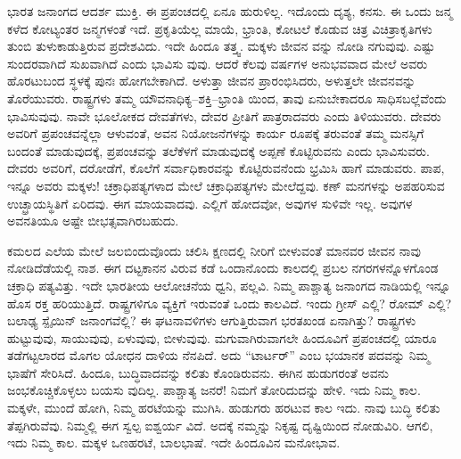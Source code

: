 ಭಾರತ ಜನಾಂಗದ ಆದರ್ಶ ಮುಕ್ತಿ. ಈ ಪ್ರಪಂಚದಲ್ಲಿ ಏನೂ ಹುರುಳಿಲ್ಲ. ಇದೊಂದು ದೃಶ್ಯ, ಕನಸು. ಈ ಒಂದು ಜನ್ಮ ಕಳೆದ ಕೋಟ್ಯಂತರ ಜನ್ಮಗಳಂತೆ ಇದೆ. ಪ್ರಕೃತಿಯೆಲ್ಲ ಮಾಯೆ, ಭ್ರಾಂತಿ, ಕೋಟಲೆ ಕೊಡುವ ಚಿತ್ರ ವಿಚಿತ್ರಾಕೃತಿಗಳು ತುಂಬಿ ತುಳುಕಾಡುತ್ತಿರುವ ಪ್ರದೇಶವಿದು. ಇದೇ ಹಿಂದೂ ತತ್ತ್ವ. ಮಕ್ಕಳು ಜೀವನ ವನ್ನು ನೋಡಿ ನಗುವುವು. ಎಷ್ಟು ಸುಂದರವಾಗಿದೆ ಸುಖವಾಗಿದೆ ಎಂದು ಭಾವಿಸು ವುವು. ಆದರೆ ಕೆಲವು ವರ್ಷಗಳ ಅನುಭವವಾದ ಮೇಲೆ ಅವರು ಹೊರಟುಬಂದ ಸ್ಥಳಕ್ಕೆ ಪುನಃ ಹೋಗಬೇಕಾಗಿದೆ. ಅಳುತ್ತಾ ಜೀವನ ಪ್ರಾರಂಭಿಸಿದರು, ಅಳುತ್ತಲೇ ಜೀವನವನ್ನು ತೊರೆಯುವರು. ರಾಷ್ಟ್ರಗಳು ತಮ್ಮ ಯೌವನಾಧಿಕ್ಯ–ಶಕ್ತಿ–ಭ್ರಾಂತಿ ಯಿಂದ, ತಾವು ಏನುಬೇಕಾದರೂ ಸಾಧಿಸಬಲ್ಲೆವೆಂದು ಭಾವಿಸುವುವು. ನಾವೇ ಭೂಲೋಕದ ದೇವತೆಗಳು, ದೇವರ ಪ್ರೀತಿಗೆ ಪಾತ್ರರಾದವರು ಎಂದು ತಿಳಿಯುವರು. ದೇವರು ಅವರಿಗೆ ಪ್ರಪಂಚವನ್ನೆಲ್ಲಾ ಆಳುವಂತೆ, ಅವನ ನಿಯೋಜನೆಗಳನ್ನು ಕಾರ್ಯ ರೂಪಕ್ಕೆ ತರುವಂತೆ ತಮ್ಮ ಮನಸ್ಸಿಗೆ ಬಂದಂತೆ ಮಾಡುವುದಕ್ಕೆ, ಪ್ರಪಂಚವನ್ನು ತಲೆಕೆಳಗೆ ಮಾಡುವುದಕ್ಕೆ ಅಪ್ಪಣೆ ಕೊಟ್ಟಿರುವನು ಎಂದು ಭಾವಿಸುವರು. ದೇವರು ಅವರಿಗೆ, ದರೋಡೆಗೆ, ಕೊಲೆಗೆ ಸರ್ವಾಧಿಕಾರವನ್ನು ಕೊಟ್ಟಿರುವನೆಂದು ಭ್ರಮಿಸಿ ಹಾಗೆ ಮಾಡುವರು. ಪಾಪ, ಇನ್ನೂ ಅವರು ಮಕ್ಕಳು! ಚಕ್ರಾಧಿಪತ್ಯಗಳಾದ ಮೇಲೆ ಚಕ್ರಾಧಿಪತ್ಯಗಳು ಮೇಲೆದ್ದವು. ಕಣ್​ ಮನಗಳನ್ನು ಅಪಹರಿಸುವ ಉಚ್ಛ್ರಾಯಸ್ಥಿತಿಗೆ ಏರಿದವು. ಈಗ ಮಾಯವಾದವು. ಎಲ್ಲಿಗೆ ಹೋದವೋ, ಅವುಗಳ ಸುಳಿವೇ ಇಲ್ಲ. ಅವುಗಳ ಅವನತಿಯೂ ಅಷ್ಟೇ ಬೀಭತ್ಸವಾಗಿರಬಹುದು.

ಕಮಲದ ಎಲೆಯ ಮೇಲೆ ಜಲಬಿಂದುವೊಂದು ಚಲಿಸಿ ಕ್ಷಣದಲ್ಲಿ ನೀರಿಗೆ ಬೀಳುವಂತೆ ಮಾನವರ ಜೀವನ ನಾವು ನೋಡಿದೆಡೆಯಲ್ಲಿ ನಾಶ. ಈಗ ದಟ್ಟಕಾನನ ವಿರುವ ಕಡೆ ಒಂದಾನೊಂದು ಕಾಲದಲ್ಲಿ ಪ್ರಬಲ ನಗರಗಳನ್ನೊಳಗೊಂಡ ಚಕ್ರಾಧಿ ಪತ್ಯವಿತ್ತು. ಇದೇ ಭಾರತೀಯ ಆಲೋಚನೆಯ ಧ್ವನಿ, ಪಲ್ಲವಿ. ನಿಮ್ಮ ಪಾಶ್ಚಾತ್ಯ ಜನಾಂಗದ ನಾಡಿಯಲ್ಲಿ ಇನ್ನೂ ಹೊಸ ರಕ್ತ ಹರಿಯುತ್ತಿದೆ. ರಾಷ್ಟ್ರಗಳಿಗೂ ವ್ಯಕ್ತಿಗೆ ಇರುವಂತೆ ಒಂದು ಕಾಲವಿದೆ. ಇಂದು ಗ್ರೀಸ್​ ಎಲ್ಲಿ? ರೋಮ್​ ಎಲ್ಲಿ? ಬಲಾಢ್ಯ ಸ್ಪೈಯಿನ್​ ಜನಾಂಗವೆಲ್ಲಿ? ಈ ಘಟನಾವಳಿಗಳು ಆಗುತ್ತಿರುವಾಗ ಭರತಖಂಡ ಏನಾಗಿತ್ತು? ರಾಷ್ಟ್ರಗಳು ಹುಟ್ಟುವುವು, ಸಾಯುವುವು, ಏಳುವುವು, ಬೀಳುವುವು. ಮಗುವಾಗಿರುವಾಗಲೇ ಹಿಂದೂವಿಗೆ ಪ್ರಪಂಚದಲ್ಲಿ ಯಾರೂ ತಡೆಗಟ್ಟಲಾರದ ಮೊಗಲ ಯೋಧನ ದಾಳಿಯ ನೆನಪಿದೆ. ಅದು “ಟಾರ್ಟರ್​” ಎಂಬ ಭಯಾನಕ ಪದವನ್ನು ನಿಮ್ಮ ಭಾಷೆಗೆ ಸೇರಿಸಿದೆ. ಹಿಂದೂ, ಬುದ್ಧಿವಾದವನ್ನು ಕಲಿತು ಕೊಂಡಿರುವನು. ಈಗಿನ ಹುಡುಗರಂತೆ ಅವನು ಜಂಭಕೊಚ್ಚಿಕೊಳ್ಳಲು ಬಯಸು ವುದಿಲ್ಲ. ಪಾಶ್ಚಾತ್ಯ ಜನರೆ! ನಿಮಗೆ ತೋರಿದುದನ್ನು ಹೇಳಿ. ಇದು ನಿಮ್ಮ ಕಾಲ. ಮಕ್ಕಳೇ, ಮುಂದೆ ಹೋಗಿ, ನಿಮ್ಮ ಹರಟೆಯನ್ನು ಮುಗಿಸಿ. ಹುಡುಗರು ಹರಟುವ ಕಾಲ ಇದು. ನಾವು ಬುದ್ಧಿ ಕಲಿತು ತೆಪ್ಪಗಿರುವೆವು. ನಿಮ್ಮಲ್ಲಿ ಈಗ ಸ್ವಲ್ಪ ಐಶ್ವರ್ಯ ವಿದೆ. ಅದಕ್ಕೆ ನಮ್ಮನ್ನು ನಿಕೃಷ್ಟ ದೃಷ್ಟಿಯಿಂದ ನೋಡುವಿರಿ. ಆಗಲಿ, ಇದು ನಿಮ್ಮ ಕಾಲ. ಮಕ್ಕಳ ಒಣಹರಟೆ, ಬಾಲಭಾಷೆ. ಇದೇ ಹಿಂದೂವಿನ ಮನೋಭಾವ.


